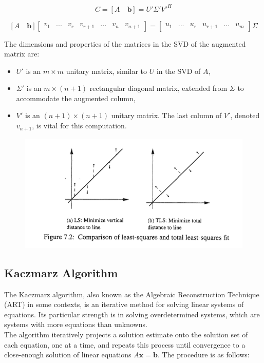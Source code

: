 \[ C =[A \quad \mathbf{b}] = U' \Sigma' V'^H \]

\[[A \quad \mathbf{b}]\begin{bmatrix}v_1&...&v_r & v_{r+1} & ...& v_n & v_{n+1}\end{bmatrix}=\begin{bmatrix}u_1&...&u_r& u_{r+1} & ...& u_m\end{bmatrix}\Sigma\]

The dimensions and properties of the matrices in the SVD of the augmented matrix are:

\begin{itemize}
    \item \( U' \) is an \( m \times m \) unitary matrix, similar to \( U \) in the SVD of \( A \),
    \item \( \Sigma' \) is an \( m \times (n+1) \) rectangular diagonal matrix, extended from \( \Sigma \) to accommodate the augmented column,
    \item \( V' \) is an \( (n+1) \times (n+1) \) unitary matrix. The last column of \( V' \), denoted \( v_{n+1} \), is vital for this computation.
\end{itemize}

\begin{figure}[H]
    \centering
    \includegraphics[width=0.75\linewidth]{img/tlsvsls.png}
    
    
\end{figure}

\subsection{Kaczmarz Algorithm}
The Kaczmarz algorithm, also known as the Algebraic Reconstruction Technique (ART) in some contexts, is an iterative method for solving linear systems of equations. Its particular strength is in solving overdetermined systems, which are systems with more equations than unknowns.\\

The algorithm iteratively projects a solution estimate onto the solution set of each equation, one at a time, and repeats this process until convergence to a close-enough solution of linear equations \( A\mathbf{x} = \mathbf{b} \). The procedure is as follows:

